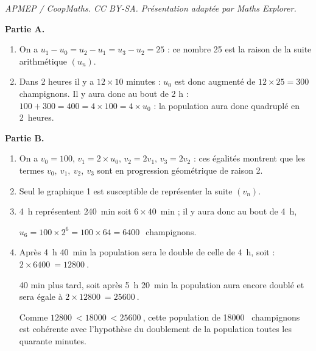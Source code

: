 \documentclass[10pt]{article}
\providecommand{\np}[2][]{{#2~#1}}
\begin{document}
\noindent\textit{APMEP / CoopMaths. CC BY-SA. Présentation adaptée par Maths Explorer.}\par\medskip
\medskip

\textbf{Partie A.}

\medskip

\begin{enumerate}
\item On a $u_1 - u_0 = u_2 - u_1 = u_3 - u_2 = 25$ : ce nombre 25 est la raison de la suite arithmétique $(u_n)$.
\item Dans 2 heures il y a $12 \times 10$ minutes : $u_0$ est donc augmenté de $12 \times 25 = 300$ champignons. Il y aura donc au bout de 2 h : $100 + 300 = 400 = 4\times 100 = 4 \times u_0$ : la population aura donc quadruplé en 2~heures.
\end{enumerate}

\medskip

\textbf{Partie B.}

\medskip

\begin{enumerate}
\item On a $v_0 = 100$, $v_1 = 2 \times u_0, \, v_2 = 2v_1, \, v_3 = 2v_2$ : ces égalités montrent que les termes $v_0,\: v_1,\: v_2,\: v_3$ sont en progression géométrique de raison 2.
\item Seul le graphique 1 est susceptible de représenter la suite $(v_n)$.
\item 4~h représentent 240~min soit $6 \times 40$~min ; il y aura donc au bout de 4~h,

$u_6 = 100 \times 2^6 = 100 \times 64 = \np{6400}$~champignons.
\item Après 4~h 40~min la population sera le double de celle de 4~h, soit : $2 \times  \np{6400} = \np{12800}$.

40 min plus tard, soit après 5~h 20~min la population aura encore doublé et sera égale à $2 \times \np{12800} = \np{25600}$.

Comme $\np{12800} < \np{18000} < \np{25600}$, cette population de \np{18000} champignons est cohérente avec l'hypothèse du doublement de la population toutes les quarante minutes.
\end{enumerate}

\bigskip
\end{document}

